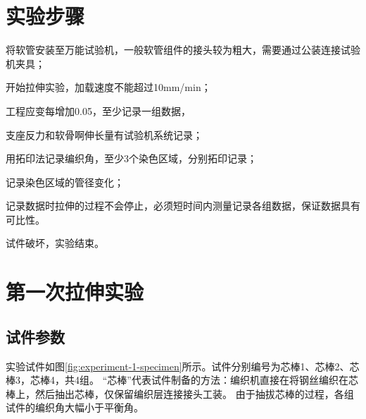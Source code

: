 \section{实验步骤}

\begin{compactenum}
	\item 将软管安装至万能试验机，一般软管组件的接头较为粗大，需要通过公装连接试验机夹具；
	\item 开始拉伸实验，加载速度不能超过10mm/min；
	\item 工程应变每增加0.05，至少记录一组数据，
	\begin{compactitem}
		\item 支座反力和软骨啊伸长量有试验机系统记录；
		\item 用拓印法记录编织角，至少3个染色区域，分别拓印记录；
		\item 记录染色区域的管径变化；
		\item 记录数据时拉伸的过程不会停止，必须短时间内测量记录各组数据，保证数据具有可比性。
	\end{compactitem}
	\item 试件破坏，实验结束。
\end{compactenum}





\section{第一次拉伸实验}
\subsection{试件参数}
 实验试件如图\ref{fig:experiment-1-specimen}所示。试件分别编号为芯棒1、芯棒2、芯棒3，芯棒4，共4组。
 “芯棒”代表试件制备的方法：编织机直接在将钢丝编织在芯棒上，然后抽出芯棒，仅保留编织层连接接头工装。
由于抽拔芯棒的过程，各组试件的编织角大幅小于平衡角。



